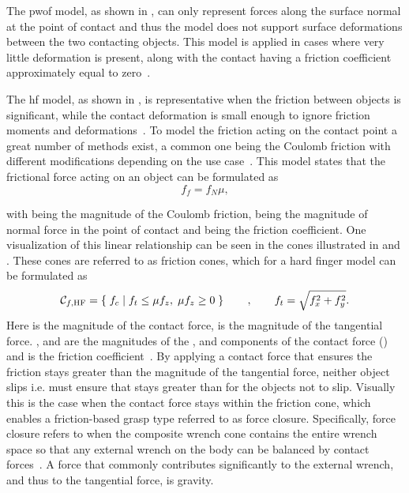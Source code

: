 The \gls{pwof} model, as shown in , can only represent forces along the surface normal  at the point of contact  and thus the model does not support surface deformations between the two contacting objects. This model is applied in cases where very little deformation is present, along with the contact having a friction coefficient approximately equal to zero~\cite[Chapter 38]{handbook-of-robotics}.\medskip


The \gls{hf} model, as shown in , is representative when the friction between objects is significant, while the contact deformation is small enough to ignore friction moments and deformations~\cite[Chapter 38]{handbook-of-robotics}. To model the friction acting on the contact point a great number of methods exist, a common one being the Coulomb friction with different modifications depending on the use case~\cite{modelling-of-joint-friction-in-robotic-manipulators-with-gear-transmissions}. 
This model states that the frictional force acting on an object can be formulated as
%
\begin{equation}
	f_f = f_N \mu,
	\label{eq:coulomb-friction}
\end{equation}

with  being the magnitude of the Coulomb friction,  being the magnitude of normal force in the point of contact and \mvar{\mu\in[0,1]} being the friction coefficient. One visualization of this linear relationship can be seen in the cones illustrated in  and . These cones are referred to as friction cones, which for a hard finger model can be formulated as
%
\begin{equation} 
	\mathcal{C}_{f,\text{HF}} = \left\{ \; f_c\; \middle|\; f_{t} \le \mu f_z,\; \mu f_z \ge 0 \; \right\} \qquad , \qquad f_t = \sqrt{f_x^2 + f_y^2}.
	\label{eq:hf}
\end{equation}
%
Here  is the magnitude of the contact force,  is the magnitude of the tangential force. ,  and  are the magnitudes of the ,  and  components of the contact force () and \mvar{\mu} is the friction coefficient~\cite[Chapter 37]{handbook-of-robotics}. By applying a contact force that ensures the friction stays greater than the magnitude of the tangential force, neither object slips i.e.  must ensure that  stays greater than  for the objects not to slip. Visually this is the case when the contact force  stays within the friction cone, which enables a friction-based grasp type referred to as force closure. Specifically, force closure refers to when the composite wrench cone contains the entire wrench space so that any external wrench  on the body can be balanced by contact forces~\cite{modern-robotics-mechanics-planning-and-control}. A force that commonly contributes significantly to the external wrench, and thus to the tangential force, is gravity. \medskip

